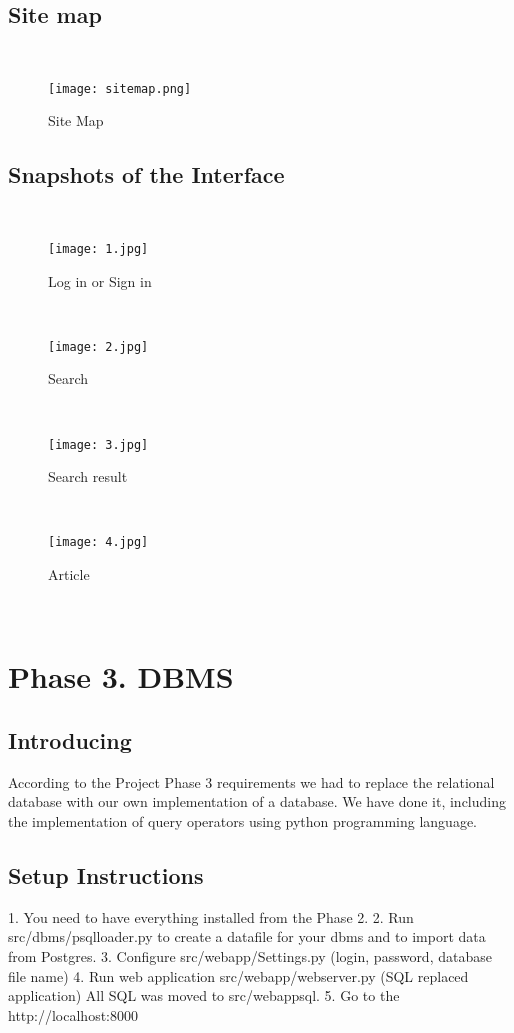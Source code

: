 \documentclass{article}
\begin{document}
\newpage
\subsection{Site map}
~
\newline
\begin{figure}[h!]
  \centering
      \texttt{[image: sitemap.png]}
  \caption{Site Map}
\end{figure}

\newpage
\subsection{Snapshots of the Interface}
~
~
\begin{figure}[h!]
  \centering
      \texttt{[image: 1.jpg]}
  \caption{Log in or Sign in}
\end{figure}
~
~
\begin{figure}[h!]
  \centering
      \texttt{[image: 2.jpg]}
  \caption{Search}
\end{figure}
~
~
\begin{figure}[h!]
  \centering
      \texttt{[image: 3.jpg]}
  \caption{Search result}
\end{figure}
~
~
\begin{figure}[h!]
  \centering
      \texttt{[image: 4.jpg]}
  \caption{Article}
\end{figure}

~

\section{Phase 3. DBMS}

\subsection{Introducing}
According to the Project Phase 3 requirements we had to replace the relational database with our own implementation of a database. We have done it, including the implementation of query operators using python programming language.

\subsection{Setup Instructions}

1. You need to have everything installed from the Phase 2.
2. Run src/dbms/psqlloader.py to create a datafile for your dbms and to import data from Postgres.
3. Configure src/webapp/Settings.py (login, password, database file name)
4. Run web application src/webapp/webserver.py (SQL replaced application)
All SQL was moved to src/webappsql.
5. Go to the http://localhost:8000
\end{document}
